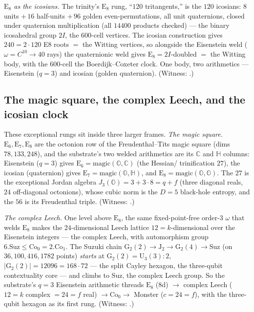 \documentclass[11pt]{article}
\begin{document}
\emph{$\mathrm E_8$ as the icosians.} The trinity's $\mathrm E_8$ rung, ``$120$
tritangents,'' is the $120$ icosians: $8$ units $+\,16$ half-units $+\,96$ golden
even-permutations, all unit quaternions, closed under quaternion multiplication
(all $14400$ products checked) --- the binary icosahedral group $2I$, the
$600$-cell vertices. The icosian construction gives $240=2\cdot120$ E8 roots
$=$ the Witting vertices, so alongside the Eisenstein weld
($\omega=C^{10}\to40$ rays) the quaternionic weld gives $\mathrm E_8 = 2I$-doubled
$=$ the Witting body, with the $600$-cell the Boerdijk--Coxeter clock. One body,
two arithmetics --- Eisenstein ($q=3$) and icosian (golden quaternion). (Witness:
.)

\subsection{The magic square, the complex Leech, and the icosian clock}

These exceptional rungs sit inside three larger frames. \emph{The magic square.}
$\mathrm E_6,\mathrm E_7,\mathrm E_8$ are the octonion row of the
Freudenthal--Tits magic square (dims $78,133,248$), and the substrate's two
welded arithmetics are its $\mathbb C$ and $\mathbb H$ columns: Eisenstein
($q=3$) gives $\mathrm E_6=\mathrm{magic}(\mathbb O,\mathbb C)$ (the Hessian/
trinification $27$), the icosian (quaternion) gives
$\mathrm E_7=\mathrm{magic}(\mathbb O,\mathbb H)$, and $\mathrm E_8=
\mathrm{magic}(\mathbb O,\mathbb O)$. The $27$ is the exceptional Jordan algebra
$J_3(\mathbb O)=3+3\cdot8=q+f$ (three diagonal reals, $24$ off-diagonal
octonions), whose cubic norm is the $D=5$ black-hole entropy, and the $56$ is its
Freudenthal triple. (Witness: .)

\emph{The complex Leech.} One level above $\mathrm E_8$, the same fixed-point-free
order-$3$ $\omega$ that welds $\mathrm E_8$ makes the $24$-dimensional Leech
lattice $12=k$-dimensional over the Eisenstein integers --- the complex Leech,
with automorphism group $6.\mathrm{Suz}\le\mathrm{Co}_0=2.\mathrm{Co}_1$. The
Suzuki chain $\mathrm G_2(2)\to\mathrm J_2\to\mathrm G_2(4)\to\mathrm{Suz}$ (on
$36,100,416,1782$ points) \emph{starts} at $\mathrm G_2(2)=\mathrm U_3(3){:}2$,
$|\mathrm G_2(2)|=12096=168\cdot72$ --- the split Cayley hexagon, the three-qubit
contextuality core --- and climbs to $\mathrm{Suz}$, the complex Leech group. So
the substrate's $q=3$ Eisenstein arithmetic threads $\mathrm E_8$ ($8$d) $\to$
complex Leech ($12=k$ complex $=24=f$ real) $\to\mathrm{Co}_0\to$ Monster
($c=24=f$), with the three-qubit hexagon as its first rung. (Witness:
.)
\end{document}
